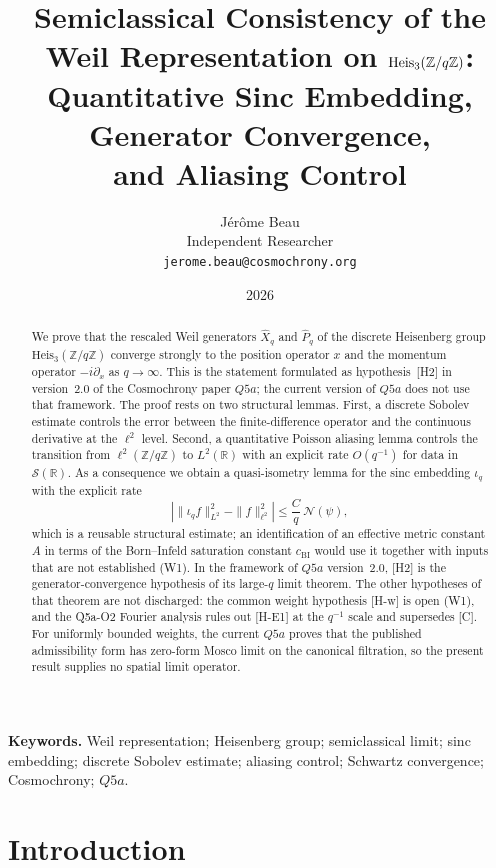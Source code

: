 \documentclass[12pt,a4paper]{article}
\title{Semiclassical Consistency of the Weil Representation on
  $\Heis(\mathbb{Z}/q\mathbb{Z})$:\\
  Quantitative Sinc Embedding, Generator Convergence,\\
  and Aliasing Control}
\author{J\'er\^ome Beau\\
\small Independent Researcher\\
\small \texttt{jerome.beau@cosmochrony.org}}
\date{2026}
\newcommand{\Heis}{\mathrm{Heis}_3}
\newcommand{\Zq}{\mathbb{Z}/q\mathbb{Z}}
\newcommand{\ltwo}{L^2(\mathbb{R})}
\newcommand{\Schwartz}{\mathcal{S}(\mathbb{R})}
\newcommand{\iotaq}{\iota_q}
\newcommand{\Xhat}{\hat{X}_q}
\newcommand{\Phat}{\hat{P}_q}
\begin{document}
  \maketitle

  \begin{abstract}
    We prove that the rescaled Weil generators $\Xhat$ and $\Phat$ of the discrete Heisenberg group
    $\Heis(\Zq)$ converge strongly to the position operator $x$ and the momentum operator $-i\partial_x$
    as $q \to \infty$.
    This is the statement formulated as hypothesis~[H2] in version~2.0 of the Cosmochrony paper
    $Q5a$; the current version of $Q5a$ does not use that framework.
    The proof rests on two structural lemmas.
    First, a discrete Sobolev estimate controls the error between the finite-difference operator
    and the continuous derivative at the $\ell^2$ level.
    Second, a quantitative Poisson aliasing lemma controls the transition from
    $\ell^2(\Zq)$ to $\ltwo$ with an explicit rate $O(q^{-1})$ for data in $\Schwartz$.
    As a consequence we obtain a quasi-isometry lemma for the sinc embedding $\iotaq$
    with the explicit rate
    \[
      \left| \|\iotaq f\|_{L^2}^2 - \|f\|_{\ell^2}^2 \right| \leq \frac{C}{q}\,\mathcal{N}(\psi),
    \]
    which is a reusable structural estimate; an identification of an effective metric constant
    $A$ in terms of the Born--Infeld saturation constant $c_{\mathrm{BI}}$ would use it together
    with inputs that are not established (W1).
    In the framework of $Q5a$ version~2.0, [H2] is the generator-convergence hypothesis of its
    large-$q$ limit theorem.
    The other hypotheses of that theorem are not discharged: the common weight hypothesis [H-w]
    is open (W1), and the Q5a-O2 Fourier analysis rules out
    [H-E1] at the $q^{-1}$ scale and supersedes [C].
    For uniformly bounded weights, the current $Q5a$ proves that the published admissibility form
    has zero-form Mosco limit on the canonical filtration, so the present result supplies no
    spatial limit operator.
  \end{abstract}

  \medskip
  \noindent\textbf{Keywords.}
  Weil representation; Heisenberg group; semiclassical limit; sinc embedding;
  discrete Sobolev estimate; aliasing control; Schwartz convergence; Cosmochrony; $Q5a$.

  \newpage
  \tableofcontents

  \newpage
  \section{Introduction}
    \label{sec:intro}
\end{document}
